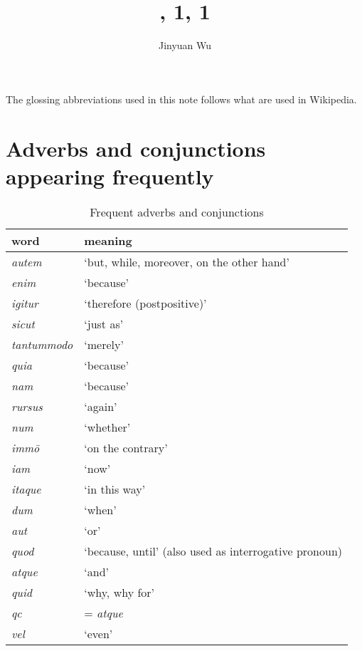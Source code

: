 \documentclass[a4paper, 12pt]{article}
\title{\form{Summa}, 1, 1}
\author{Jinyuan Wu}
\newcommand{\form}[1]{\emph{#1}}
\newcommand{\translate}[1]{`#1'}
\begin{document}
\maketitle

The glossing abbreviations used in this note 
follows what are used in Wikipedia.

\section{Adverbs and conjunctions appearing frequently}

\begin{table}[H]
    \caption{Frequent adverbs and conjunctions}
    \centering
    \begin{tabular}{ll}
        \toprule
        word               & meaning \\
        \midrule
        \form{autem}       & \translate{but, while, moreover, on the other hand}    \\
        \form{enim}        & \translate{because} \\
        \form{igitur}      & \translate{therefore (postpositive)}                   \\
        \form{sicut}       & \translate{just as}                                    \\
        \form{tantummodo}  & \translate{merely}                                     \\
        \form{quia}        & \translate{because} \\
        \form{nam}         & \translate{because} \\
        \form{rursus}      & \translate{again} \\
        \form{num}         & \translate{whether} \\
        \form{imm\={o}}    & \translate{on the contrary} \\
        \form{iam}         & \translate{now}  \\
        \form{itaque}      & \translate{in this way}  \\
        \form{dum}         & \translate{when} \\
        \form{aut}         & \translate{or} \\
        \form{quod}        & \translate{because, until} (also used as interrogative pronoun) \\
        \form{atque}       & \translate{and} \\
        \form{quid}        & \translate{why, why for} \\
        \form{qc}          & = \form{atque} \\
        \form{vel}         & \translate{even} \\
        \bottomrule
    \end{tabular}
\end{table}
\end{document}
